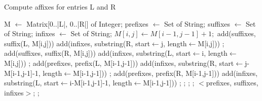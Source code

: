 \documentclass[PhD-Yoann-Dupont.tex]{subfiles}
\begin{document}
\begin{algorithm}[ht!]
\caption{Compute affixes for entries L and R}
\label{alg:extractAffixes}
\begin{algorithmic}
    \State M $\gets$ Matrix[0..|L|, 0..|R|] of Integer;
    \State prefixes $\gets$ Set of String;
    \State suffixes $\gets$ Set of String;
    \State infixes $\gets$ Set of String;
                \State $M[i,j]\gets M[i-1,j-1] + 1;$
                    \State add(suffixes, suffix(L, M[i,j]))
                        \State add(infixes, substring(R, start$\gets$j, length$\gets$M[i,j]))
                    \EndIf;
                    \State add(suffixes, suffix(R, M[i,j]))
                    \State add(infixes, substring(L, start$\gets$i, length$\gets$M[i,j]))
                \EndIf;
                    \State add(prefixes, prefix(L, M[i-1,j-1]))
                        \State add(infixes, substring(R, start$\gets$j-M[i-1,j-1]-1, length$\gets$M[i-1,j-1]))
                    \EndIf;
                    \State add(prefixes, prefix(R, M[i-1,j-1]))
                    \State add(infixes, substring(L, start$\gets$i-M[i-1,j-1]-1, length$\gets$M[i-1,j-1]))
                \EndIf;
            \EndIf;
        \EndFor;
    \EndFor;
    \State \Return $<$prefixes, suffixes, infixes$>$;
    \EndFunction;
\end{algorithmic}
\end{algorithm}
\end{document}
